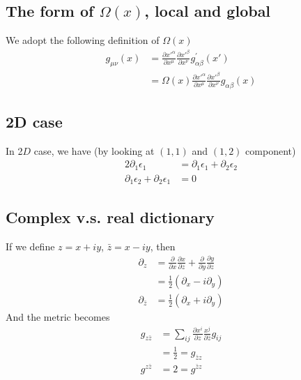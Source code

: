 \documentclass[letterpaper,12pt]{article}
\theoremstyle{definition}
\theoremstyle{remark}
\begin{document}
\subsection{The form of $\Omega(x)$, local and global}
We adopt the following definition of $\Omega(x)$
\begin{align}
    g_{\mu\nu}(x)&=\frac{\partial x'^{\alpha}}{\partial x^{\mu}}\frac{\partial x'^{\beta}}{\partial x^{\nu}}g^{'}_{\alpha\beta}(x')\\
    &=\Omega(x)\frac{\partial x'^{\alpha}}{\partial x^{\mu}}\frac{\partial x'^{\beta}}{\partial x^{\nu}}g_{\alpha\beta}(x)
\end{align}
\subsection{2D case}
In 2$D$ case, we have (by looking at $(1,1)$ and $(1,2)$ component)
\begin{align}
    2\partial_{1}\epsilon_{1}&=\partial_1\epsilon_1+\partial_2\epsilon_2\\
    \partial_1\epsilon_2+\partial_2\epsilon_1&=0
\end{align}
\subsection{Complex v.s. real dictionary}
If we define $z=x+iy$, $\bar{z}=x-iy$, then
\begin{align}
    \partial_z&=\frac{\partial}{\partial x}\frac{\partial x}{\partial z}+\frac{\partial}{\partial y}\frac{\partial y}{\partial z}\\
    &=\frac{1}{2}(\partial_x-i\partial_y)\\
    \partial_{\bar{z}}&=\frac{1}{2}(\partial_x+i\partial_y)
\end{align}
And the metric becomes
\begin{align}
    g_{z\bar{z}}&=\sum_{ij}\frac{\partial x^{i}}{\partial z}\frac{x^{j}}{\partial{\bar{z}}}g_{ij}\\
    &=\frac{1}{2}=g_{\bar{z}z}\\
    g^{z\bar{z}}&=2=g^{\bar{z}z}
\end{align}
\end{document}
